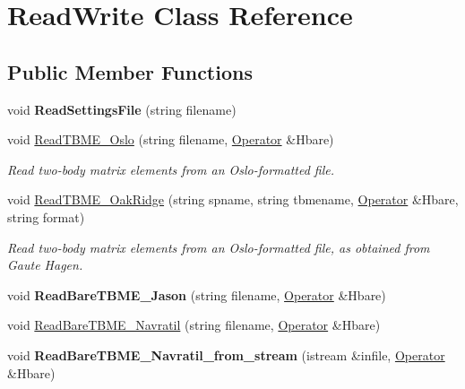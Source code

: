 \hypertarget{classReadWrite}{}\section{Read\+Write Class Reference}
\label{classReadWrite}
\subsection*{Public Member Functions}
\begin{DoxyCompactItemize}
\item 
void {\bfseries Read\+Settings\+File} (string filename)\hypertarget{classReadWrite_a7074f8c5e6b1bbeb90a4c534b913ac53}{}\label{classReadWrite_a7074f8c5e6b1bbeb90a4c534b913ac53}

\item 
void \hyperlink{classReadWrite_aa8d42bb8082881c30331a44f01118381}{Read\+T\+B\+M\+E\+\_\+\+Oslo} (string filename, \hyperlink{classOperator}{Operator} \&Hbare)\hypertarget{classReadWrite_aa8d42bb8082881c30331a44f01118381}{}\label{classReadWrite_aa8d42bb8082881c30331a44f01118381}

\begin{DoxyCompactList}\small\item\em Read two-\/body matrix elements from an Oslo-\/formatted file. \end{DoxyCompactList}\item 
void \hyperlink{classReadWrite_ab83058026c0d8afc94e792fdb46bcffd}{Read\+T\+B\+M\+E\+\_\+\+Oak\+Ridge} (string spname, string tbmename, \hyperlink{classOperator}{Operator} \&Hbare, string format)\hypertarget{classReadWrite_ab83058026c0d8afc94e792fdb46bcffd}{}\label{classReadWrite_ab83058026c0d8afc94e792fdb46bcffd}

\begin{DoxyCompactList}\small\item\em Read two-\/body matrix elements from an Oslo-\/formatted file, as obtained from Gaute Hagen. \end{DoxyCompactList}\item 
void {\bfseries Read\+Bare\+T\+B\+M\+E\+\_\+\+Jason} (string filename, \hyperlink{classOperator}{Operator} \&Hbare)\hypertarget{classReadWrite_ae5271000cceab5fcebab7e9d2faf9f1f}{}\label{classReadWrite_ae5271000cceab5fcebab7e9d2faf9f1f}

\item 
void \hyperlink{classReadWrite_ab66f5d7e2e352e973597915c08cad45d}{Read\+Bare\+T\+B\+M\+E\+\_\+\+Navratil} (string filename, \hyperlink{classOperator}{Operator} \&Hbare)
\item 
void {\bfseries Read\+Bare\+T\+B\+M\+E\+\_\+\+Navratil\+\_\+from\+\_\+stream} (istream \&infile, \hyperlink{classOperator}{Operator} \&Hbare)\hypertarget{classReadWrite_a5945175ede7c2a040f09cfbc799b3066}{}\label{classReadWrite_a5945175ede7c2a040f09cfbc799b3066}


\end{DoxyCompactItemize}
